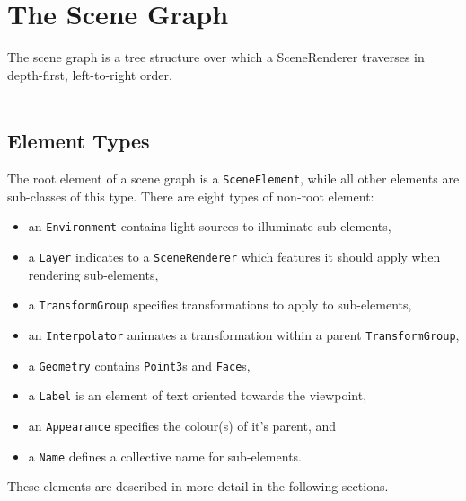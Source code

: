 \documentclass[10pt,aps, prb,preprint]{article}
\begin{document}
\newpage
\section{The Scene Graph}
The scene graph is a tree structure over which a SceneRenderer traverses in depth-first, left-to-right order. 
\\
\\
\subsection{Element Types}
The root element of a scene graph is a \texttt{SceneElement}, while all other elements are sub-classes of this type. There are eight types of non-root element:
\begin{itemize}
\item an \texttt{Environment} contains light sources to illuminate sub-elements,
\item a \texttt{Layer} indicates to a \texttt{SceneRenderer} which features it should apply when rendering sub-elements,
\item a \texttt{TransformGroup} specifies transformations to apply to sub-elements,
\item an \texttt{Interpolator} animates a transformation within a parent \texttt{TransformGroup},
\item a \texttt{Geometry} contains \texttt{Point3}s and \texttt{Face}s,
\item a \texttt{Label} is an element of text oriented towards the viewpoint,
\item an \texttt{Appearance} specifies the colour(s) of it's parent, and
\item a \texttt{Name} defines a collective name for sub-elements.
\end{itemize}
These elements are described in more detail in the following sections.


\end{document}
